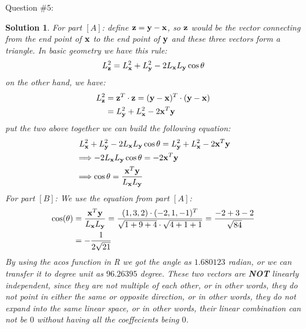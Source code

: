 \documentclass[11pt]{article}\usepackage[]{graphicx}\usepackage[]{color}
\newtheorem{sol}{Solution}
\begin{document}
Question $\# 5$:
\begin{sol}
	For part $[A]$:\vskip 2mm
	define ${\bf z} = {\bf y} - {\bf x}$, so ${\bf z}$ would be the vector connecting from the end point of ${\bf x}$ to the end point of ${\bf y}$ and these three vectors form a triangle.\vskip 2mm
	In basic geometry we have this rule:
	\begin{align*}
		L_{{\bf z}}^2= L_{{\bf x}}^2 + L_{{\bf y}}^2 - 2L_{{\bf x}}L_{{\bf y}}\cos\theta
	\end{align*}
	on the other hand, we have:
	\begin{align*}
		L_{{\bf z}}^2 &= {\bf z}^T\cdot {\bf z} = ({\bf y} - {\bf x})^T\cdot({\bf y} - {\bf x})\\
		&= L_{{\bf y}}^2 + L_{{\bf x}}^2 - 2{\bf x}^T{{\bf y}}
	\end{align*}
	put the two above together we can build the following equation:
	\begin{align*}
		&\ L_{{\bf x}}^2 + L_{{\bf y}}^2 - 2L_{{\bf x}}L_{{\bf y}}\cos\theta = L_{{\bf y}}^2 + L_{{\bf x}}^2 - 2{\bf x}^T{{\bf y}}\\
		&\Longrightarrow - 2L_{{\bf x}}L_{{\bf y}}\cos\theta = - 2{\bf x}^T{{\bf y}}\\
		&\Longrightarrow \cos\theta = \frac{{\bf x}^T{{\bf y}}}{L_{{\bf x}}L_{{\bf y}}}
	\end{align*}
	For part $[B]$:\vskip 2mm
	We use the equation from part $[A]$:
	\begin{align*}
		\cos(\theta) &= \frac{{\bf x}^T{\bf y}}{L_{{\bf x}}L_{\bf y}} = \frac{(1, 3, 2)\cdot (-2, 1, -1)^T}{\sqrt{1 + 9 + 4}\cdot \sqrt{4 + 1+ 1}} = \frac{-2 + 3 - 2}{\sqrt{84}}\\
		&= -\frac{1}{2\sqrt{21}}
	\end{align*}
	By using the acos function in R we got the angle as $1.680123$ radian, or we can transfer it to degree unit as $96.26395$ degree.\vskip 2mm
	These two vectors are {\bf NOT} linearly independent, since they are not multiple of each other, or in other words, they do not point in either the same or opposite direction, or in other words, they do not expand into the same linear space, or in other words, their linear combination can not be $0$ without having all the coeffecients being $0$.
\end{sol}
\end{document}

